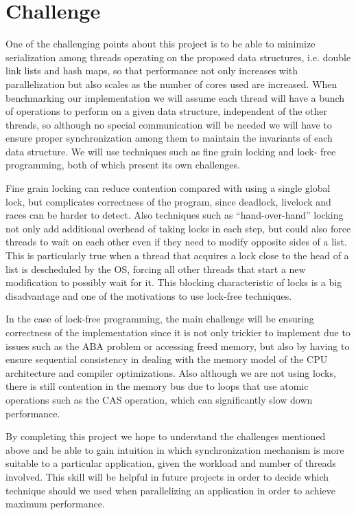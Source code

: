 \documentclass[11pt]{article}
\begin{document}
\section*{Challenge} 
One of the challenging points about this project is to be
able to minimize serialization among threads operating on the proposed data
structures, i.e. double link lists and hash maps, so that performance not only
increases with parallelization but also scales as the number of cores used are
increased. When benchmarking our implementation we will assume each thread will
have a bunch of operations to perform on a given data structure, independent of
the other threads, so although no special communication will be needed we will
have to ensure proper synchronization among them to maintain the invariants of
each data structure. We will use techniques such as fine grain locking and lock-
free programming, both of which present its own challenges.

Fine grain locking can reduce contention compared with using a single global
lock, but complicates correctness of the program, since deadlock, livelock and
races can be harder to detect. Also techniques such as “hand-over-hand” locking
not only add additional overhead of taking locks in each step, but could also
force threads to wait on each other even if they need to modify opposite sides
of a list. This is particularly true when a thread that acquires a lock close to
the head of a list is descheduled by the OS, forcing all other threads that
start a new modification to possibly wait for it. This blocking characteristic
of locks is a big disadvantage and one of the motivations to use lock-free
techniques.

In the case of lock-free programming, the main challenge will be ensuring
correctness of the implementation since it is not only trickier to implement due
to issues such as the ABA problem or accessing freed memory, but also by having
to ensure sequential consistency in dealing with the memory model of the CPU
architecture and compiler optimizations. Also although we are not using locks,
there is still contention in the memory bus due to loops that use atomic
operations such as the CAS operation, which can significantly slow down
performance.

By completing this project we hope to understand the challenges mentioned above
and be able to gain intuition in which synchronization mechanism is more
suitable to a particular application, given the workload and number of threads
involved. This skill will be helpful in future projects in order to decide which
technique should we used when parallelizing an application in order to achieve
maximum performance.
\end{document}
